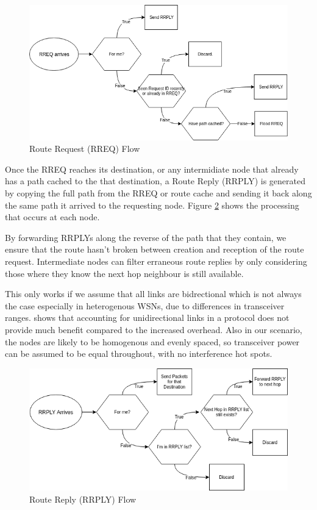 \documentclass[12pt]{article}
\begin{document}
\begin{figure}[!ht]
	\centering
	\includegraphics[width=\linewidth]{images/rreqflow}
	\caption{Route Request (RREQ) Flow}
	\label{fig:rreqflow}
\end{figure}

Once the RREQ reaches its destination, or any intermidiate node that already has a path cached to the that destination, a Route Reply (RRPLY) is generated by copying the full path from the RREQ or route cache and sending it back along the same path it arrived to the requesting node. Figure \ref{fig:rrplyflow} shows the processing that occurs at each node.

By forwarding RRPLYs along the reverse of the path that they contain, we ensure that the route hasn't broken between creation and reception of the route request. Intermediate nodes can filter erraneous route replies by only considering those where they know the next hop neighbour is still available.

This only works if we assume that all links are bidrectional which is not always the case especially in heterogenous WSNs, due to differences in transceiver ranges. 
\cite{unidirec} shows that accounting for unidirectional links in a protocol does not provide much benefit compared to the increased overhead. Also in our scenario, the nodes are likely to be homogenous and evenly spaced, so transceiver power can be assumed to be equal throughout, with no interference hot spots. 

\begin{figure}[h]
	\centering
	\includegraphics[width=\linewidth]{images/rrplyflow}
	\caption{Route Reply (RRPLY) Flow}
	\label{fig:rrplyflow}
\end{figure}
\end{document}
